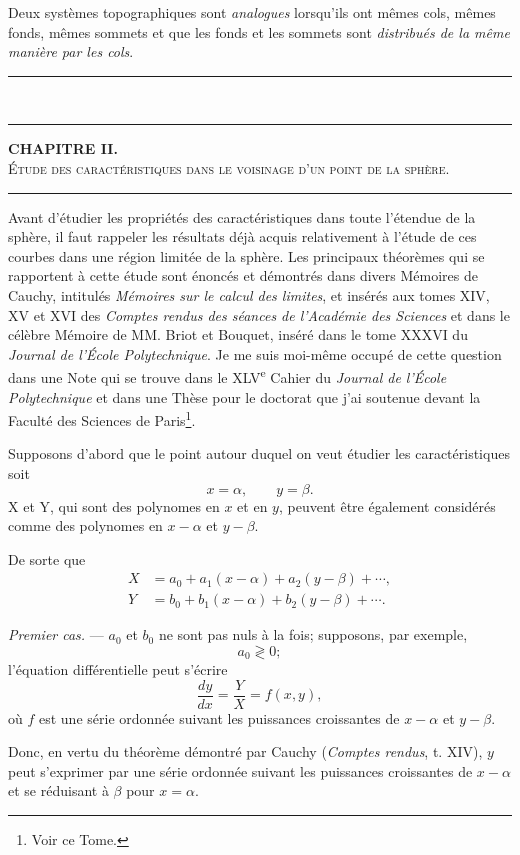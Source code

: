 \documentclass[11pt]{article}
\newcommand{\ornament}{\begin{center}\rule{2.5em}{0.4pt}\,\raisebox{0.1ex}{\tiny$\bullet\bullet\bullet$}\,\rule{2.5em}{0.4pt}\end{center}}
\newcommand{\shortline}{\begin{center}\rule{3.5em}{0.4pt}\end{center}}
\begin{document}
Deux systèmes topographiques sont \emph{analogues} lorsqu’ils ont mêmes cols, mêmes fonds, mêmes sommets et que les fonds et les sommets sont \emph{distribués de la même manière par les cols}.

\ornament

\setcounter{footnote}{0}

\begin{center}
{\bfseries CHAPITRE II.}\\[0.8em]
{\scshape Étude des caractéristiques dans le voisinage d’un point de la sphère.}
\end{center}

\shortline

Avant d’étudier les propriétés des caractéristiques dans toute l’étendue de la sphère, il faut rappeler les résultats déjà acquis relativement à l’étude de ces courbes dans une région limitée de la sphère. Les principaux théorèmes qui se rapportent à cette étude sont énoncés et démontrés dans divers Mémoires de Cauchy, intitulés \emph{Mémoires sur le calcul des limites}, et insérés aux tomes XIV, XV et XVI des \emph{Comptes rendus des séances de l’Académie des Sciences} et dans le célèbre Mémoire de MM. Briot et Bouquet, inséré dans le tome XXXVI du \emph{Journal de l’École Polytechnique}. Je me suis moi-même occupé de cette question dans une Note qui se trouve dans le XLV\textsuperscript{e} Cahier du \emph{Journal de l’École Polytechnique} et dans une Thèse pour le doctorat que j’ai soutenue devant la Faculté des Sciences de Paris\footnote{Voir ce Tome.}.

Supposons d’abord que le point autour duquel on veut étudier les caractéristiques soit
\[
x=\alpha,\qquad y=\beta.
\]
X et Y, qui sont des polynomes en $x$ et en $y$, peuvent être également considérés comme des polynomes en $x-\alpha$ et $y-\beta$.

De sorte que
\[
\begin{aligned}
X&=a_0+a_1(x-\alpha)+a_2(y-\beta)+\cdots,\\
Y&=b_0+b_1(x-\alpha)+b_2(y-\beta)+\cdots.
\end{aligned}
\]

\emph{Premier cas.} --- $a_0$ et $b_0$ ne sont pas nuls à la fois; supposons, par exemple,
\[
a_0\gtrless0;
\]
l’équation différentielle peut s’écrire
\[
\frac{dy}{dx}=\frac{Y}{X}=f(x,y),
\]
où $f$ est une série ordonnée suivant les puissances croissantes de $x-\alpha$ et $y-\beta$.

Donc, en vertu du théorème démontré par Cauchy (\emph{Comptes rendus}, t. XIV), $y$ peut s’exprimer par une série ordonnée suivant les puissances croissantes de $x-\alpha$ et se réduisant à $\beta$ pour $x=\alpha$.
\end{document}
